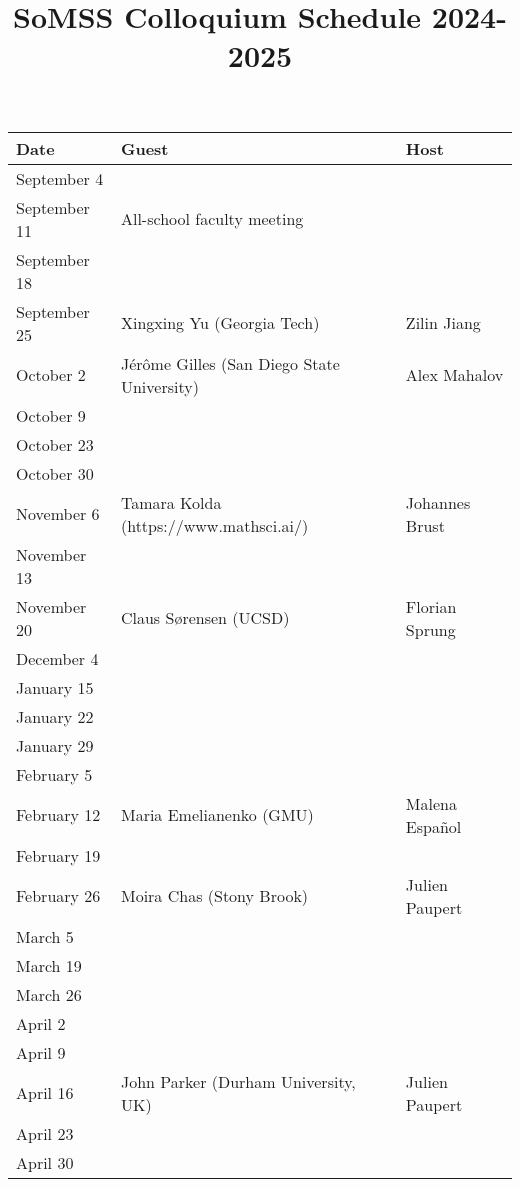 \documentclass[11pt]{article}
\begin{document}
\title{SoMSS Colloquium Schedule 2024-2025}
\author{}
\date{}
\maketitle



\begin{table}[htp]
\begin{center}
\begin{tabular}{|l|l|l|}
\hline
Date & Guest & Host\\
\hline
September 4 & & \\
September 11 & All-school faculty meeting & \\
September 18 & & \\
September 25 & Xingxing Yu (Georgia Tech) & Zilin Jiang\\
October 2 &J\'er\^ome Gilles (San Diego State University)& Alex Mahalov \\
October 9 & & \\
October 23 & & \\
October 30 & & \\
November 6 & Tamara Kolda (https://www.mathsci.ai/) & Johannes Brust\\
November 13 & & \\
November 20 &Claus S\o rensen (UCSD) & Florian Sprung \\
December 4 & & \\
January 15 & & \\
January 22 & & \\
January 29 & & \\
February 5 & & \\
February 12 & Maria Emelianenko (GMU) & Malena Espa\~nol\\
February 19 & & \\
February 26  & Moira Chas (Stony Brook) & Julien Paupert \\
March 5 & & \\
March 19 & & \\
March 26 & & \\
April 2 & & \\
April 9 & & \\
April 16 & John Parker (Durham University, UK)& Julien Paupert \\
April 23 & & \\
April 30 & & \\
\hline
\end{tabular}
\end{center}
\label{default}
\end{table}%
\end{document}

